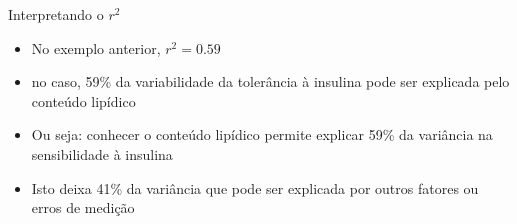 \documentclass{beamer}
\begin{document}
\begin{frame}{Interpretando o $r^2$}
  \begin{itemize}
  \item No exemplo anterior, $r^2 = 0.59$
  \item no caso, 59\% da variabilidade da tolerância à insulina pode
    ser explicada pelo conteúdo lipídico
  \item Ou seja: conhecer o conteúdo lipídico permite explicar 59\%
    da variância na sensibilidade à insulina
  \item Isto deixa 41\% da variância que pode ser explicada por outros
    fatores ou erros de medição
  \end{itemize}
\end{frame}


    

    


\end{document}
